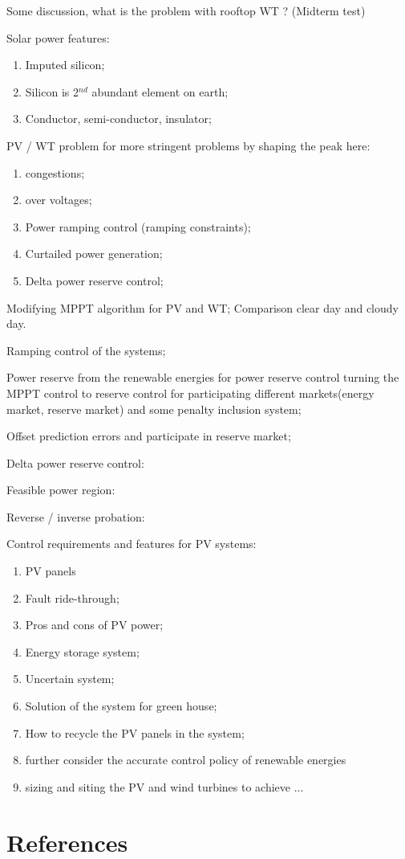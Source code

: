 \documentclass{article}
\newcommand{\slw}{\color{red}}
\begin{document}
Some discussion, what is the problem with rooftop WT ? (Midterm test)

Solar power features:
\begin{enumerate}
  \item Imputed silicon;
  \item Silicon is 2$^{nd}$ abundant element on earth;
  \item Conductor, semi-conductor, insulator;
\end{enumerate}

PV / WT problem for more stringent problems by shaping the peak here:
\begin{enumerate}
  \item congestions;
  \item over voltages;
  \item Power ramping control (ramping constraints);
  \item Curtailed power generation;
  \item Delta power reserve control;
\end{enumerate}

Modifying MPPT algorithm for PV and WT; 
Comparison clear day and cloudy day.

Ramping control of the systems;

Power reserve from the renewable energies for power reserve control {\slw turning the MPPT control to reserve control for participating different markets(energy market, reserve market) and some penalty inclusion system}; 

Offset prediction errors and participate in reserve market;

Delta power reserve control: 

Feasible power region: 

Reverse / inverse probation: 

Control requirements and features for PV systems:
\begin{enumerate}
  \item PV panels
  \item Fault ride-through;
  \item Pros and cons of PV power;
  \item Energy storage system;
  \item Uncertain system;
  \item Solution of the system for green house;
  \item How to recycle the PV panels in the system;
  \item {\slw further consider the accurate control policy of renewable energies}
  \item {\slw sizing and siting the PV and wind turbines to achieve ...}
\end{enumerate}


\section*{References}

\medskip

\small
\end{document}
